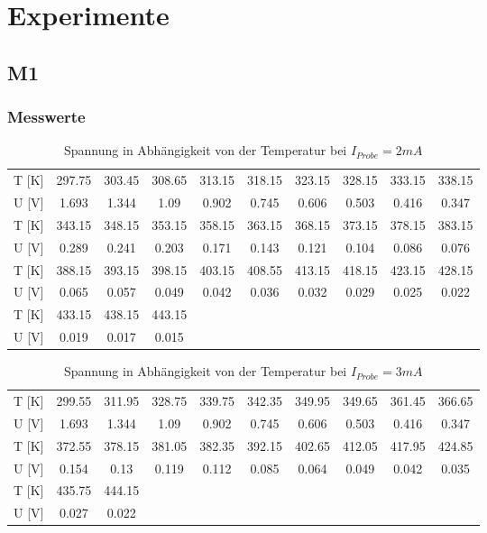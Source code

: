 \section{Experimente}
\subsection{M1}

\subsubsection{Messwerte}
\begin{table}[H]
\centering
\begin{tabular}{|c||c|c|c|c|c|c|c|c|c|}
\hline
T [K] & 297.75 & 303.45 & 308.65 & 313.15 & 318.15 & 323.15 & 328.15 & 333.15 & 338.15 \\
U [V] & 1.693 & 1.344 & 1.09 & 0.902 & 0.745 & 0.606 & 0.503 & 0.416 & 0.347\\
\hline
 T [K] & 343.15 & 348.15 & 353.15 & 358.15 & 363.15 & 368.15 & 373.15 & 378.15 & 383.15\\ 
U [V] & 0.289 & 0.241 &
   0.203 & 0.171 & 0.143 & 0.121 & 0.104 & 0.086 & 0.076\\ 
   \hline
 T [K] & 388.15 &
   393.15 & 398.15 & 403.15 & 408.55 & 413.15 & 418.15 & 423.15 & 428.15\\ 
   U [V] & 0.065 & 0.057 & 0.049 & 0.042
   & 0.036 & 0.032 & 0.029 & 0.025 & 0.022\\ 
   \hline
T [K]& 433.15 & 438.15 & 443.15 & & & & & & \\
U [V] & 0.019 & 0.017 & 0.015 & & & & & & \\
 \hline
\end{tabular}
\caption{Spannung in Abhängigkeit von der Temperatur bei $I_{Probe}=2mA$}
\end{table}  

\begin{table}[H]
\centering
\begin{tabular}{|c||c|c|c|c|c|c|c|c|c|}
\hline
T [K] & 299.55 & 311.95 & 328.75 & 339.75 & 342.35 & 349.95 & 349.65 & 361.45 & 366.65 \\
U [V] & 1.693 & 1.344 & 1.09 & 0.902 & 0.745 & 0.606 & 0.503 & 0.416 & 0.347\\
\hline
 T [K] & 372.55
   & 378.15 & 381.05 & 382.35 & 392.15 & 402.65 & 412.05 & 417.95 & 424.85\\ 
U [V] & 0.154 & 0.13 &
   0.119 & 0.112 & 0.085 & 0.064 & 0.049 & 0.042 & 0.035\\ 
   \hline
T [K]& 435.75 &
   444.15 & & & & & & & \\
U [V]  & 0.027 & 0.022 &  & & & & & & \\
 \hline
\end{tabular}
\caption{Spannung in Abhängigkeit von der Temperatur bei $I_{Probe}=3mA$}
\end{table} 

